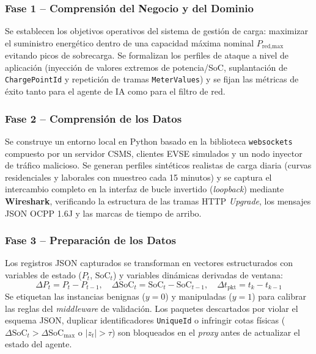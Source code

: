 \documentclass[conference]{IEEEtran}
\begin{document}
\subsubsection{Fase 1 -- Comprensión del Negocio y del Dominio}
Se establecen los objetivos operativos del sistema de gestión de carga: maximizar el suministro energético dentro de una capacidad máxima nominal $P_{\text{red,max}}$ evitando picos de sobrecarga. Se formalizan los perfiles de ataque a nivel de aplicación (inyección de valores extremos de potencia/SoC, suplantación de \texttt{ChargePointId} y repetición de tramas \texttt{MeterValues}) y se fijan las métricas de éxito tanto para el agente de IA como para el filtro de red.

\subsubsection{Fase 2 -- Comprensión de los Datos}
Se construye un entorno local en Python basado en la biblioteca \texttt{websockets} compuesto por un servidor CSMS, clientes EVSE simulados y un nodo inyector de tráfico malicioso. Se generan perfiles sintéticos realistas de carga diaria (curvas residenciales y laborales con muestreo cada 15 minutos) y se captura el intercambio completo en la interfaz de bucle invertido (\textit{loopback}) mediante \textbf{Wireshark}, verificando la estructura de las tramas HTTP \textit{Upgrade}, los mensajes JSON OCPP 1.6J y las marcas de tiempo de arribo.

\subsubsection{Fase 3 -- Preparación de los Datos}
Los registros JSON capturados se transforman en vectores estructurados con variables de estado ($P_t$, $\text{SoC}_t$) y variables dinámicas derivadas de ventana:
\begin{equation}
\Delta P_t = P_t - P_{t-1}, \quad \Delta \text{SoC}_t = \text{SoC}_t - \text{SoC}_{t-1}, \quad \Delta t_{\text{pkt}} = t_k - t_{k-1}
\end{equation}
Se etiquetan las instancias benignas ($y=0$) y manipuladas ($y=1$) para calibrar las reglas del \textit{middleware} de validación. Los paquetes descartados por violar el esquema JSON, duplicar identificadores \texttt{UniqueId} o infringir cotas físicas ($\Delta \text{SoC}_t > \Delta \text{SoC}_{\max}$ o $|z_t| > \tau$) son bloqueados en el \textit{proxy} antes de actualizar el estado del agente.
\end{document}
